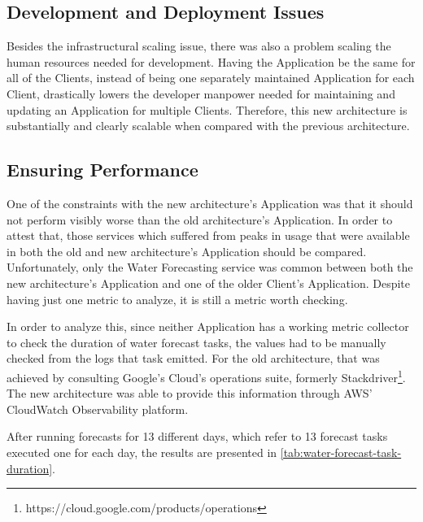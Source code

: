 \subsection{Development and Deployment Issues}\label{results-and-discussion:ss:development-and-deployment-issues}

Besides the infrastructural scaling issue, there was also a problem scaling the human resources needed for development. Having the Application be the same for all of the Clients, instead of being one separately maintained Application for each Client, drastically lowers the developer manpower needed for maintaining and updating an Application for multiple Clients. Therefore, this new architecture is substantially and clearly scalable when compared with the previous architecture.

\subsection{Ensuring Performance}\label{results-and-discussion:ss:ensuring-performance}

One of the constraints with the new architecture's Application was that it should not perform visibly worse than the old architecture's Application. In order to attest that, those services which suffered from peaks in usage that were available in both the old and new architecture's Application should be compared. Unfortunately, only the Water Forecasting service was common between both the new architecture's Application and one of the older Client's Application. Despite having just one metric to analyze, it is still a metric worth checking.

In order to analyze this, since neither Application has a working metric collector to check the duration of water forecast tasks, the values had to be manually checked from the logs that task emitted. For the old architecture, that was achieved by consulting Google's Cloud's operations suite, formerly Stackdriver\footnote{https://cloud.google.com/products/operations\label{foot:stackdriver}}. The new architecture was able to provide this information through AWS' CloudWatch Observability platform.



After running forecasts for 13 different days, which refer to 13 forecast tasks executed one for each day, the results are presented in \cref{tab:water-forecast-task-duration}.



